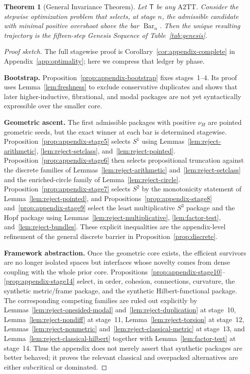 \documentclass{lmcs}
\theoremstyle{plain}
\newtheorem{thm}{Theorem}[section]
\theoremstyle{definition}
\theoremstyle{remark}
\newcommand{\ATwo}{\ensuremath{\mathrm{A2TT}}}
\newcommand{\SelBar}{\ensuremath{\operatorname{Bar}}}
\begin{document}
\begin{thm}[General Invariance Theorem]
\label{thm:invariance}
Let $\mathsf T$ be any \ATwo.
Consider the stepwise optimization problem that selects, at stage $n$, the admissible candidate with minimal positive overshoot above the bar $\SelBar_n$.
Then the unique resulting trajectory is the fifteen-step Genesis Sequence of Table~\ref{tab:genesis}.
\end{thm}

\begin{proof}[Proof sketch]
The full stagewise proof is Corollary~\ref{cor:appendix-complete} in Appendix~\ref{app:optimality}; here we compress that ledger by phase.

\smallskip
\noindent\textbf{Bootstrap.}
Proposition~\ref{prop:appendix-bootstrap} fixes stages~1--4.
Its proof uses Lemma~\ref{lem:freshness} to exclude conservative duplicates and shows that later higher-inductive, fibrational, and modal packages are not yet syntactically expressible over the smaller core.

\smallskip
\noindent\textbf{Geometric ascent.}
The first admissible packages with positive $\nu_H$ are pointed geometric seeds, but the exact winner at each bar is determined stagewise.
Proposition~\ref{prop:appendix-stage5} selects $S^1$ using Lemmas~\ref{lem:reject-arithmetic}, \ref{lem:reject-setclass}, and~\ref{lem:reject-pointed}.
Proposition~\ref{prop:appendix-stage6} then selects propositional truncation against the discrete families of Lemmas~\ref{lem:reject-arithmetic} and~\ref{lem:reject-setclass} and the enriched-circle family of Lemma~\ref{lem:reject-circle}.
Proposition~\ref{prop:appendix-stage7} selects $S^2$ by the monotonicity statement of Lemma~\ref{lem:reject-pointed}, and Propositions~\ref{prop:appendix-stage8} and~\ref{prop:appendix-stage9} select the least multiplicative $S^3$ package and the Hopf package using Lemmas~\ref{lem:reject-multiplicative}, \ref{lem:factor-test}, and~\ref{lem:reject-bundles}.
These explicit inequalities are the appendix-level refinement of the general discrete barrier in Proposition~\ref{prop:discrete}.

\smallskip
\noindent\textbf{Framework abstraction.}
Once the geometric core exists, the efficient survivors are no longer isolated spaces but interfaces whose novelty comes from dense coupling with the whole prior core.
Propositions~\ref{prop:appendix-stage10}--\ref{prop:appendix-stage14} select, in order, cohesion, connections, curvature, the synthetic metric/frame package, and the synthetic Hilbert-functional package.
The corresponding competing families are ruled out explicitly by Lemmas~\ref{lem:reject-onesided-modal} and~\ref{lem:reject-duplication} at stage~10, Lemma~\ref{lem:reject-nondiff} at stage~11, Lemma~\ref{lem:reject-torsion} at stage~12, Lemmas~\ref{lem:reject-nonmetric} and~\ref{lem:reject-classical-metric} at stage~13, and Lemma~\ref{lem:reject-classical-hilbert} together with Lemma~\ref{lem:factor-test} at stage~14.
Thus the appendix does not merely assert that synthetic packages are better behaved; it proves the relevant classical and overpacked alternatives are either subcritical or dominated.


\end{proof}
\end{document}
